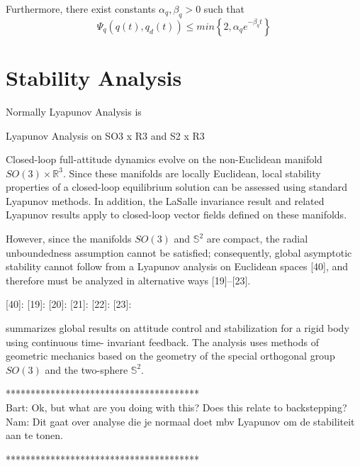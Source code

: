 Furthermore, there exist constants $ \alpha_q,\beta_q>0 $ such that
\begin{equation}\label{key}
\Psi_q(q(t),q_d(t)) \leq min\left\lbrace 2,\alpha_qe^{-\beta_qt}\right\rbrace 
\end{equation}

\section{Stability Analysis}\label{sec:con.sta}

Normally Lyapunov Analysis is 


Lyapunov Analysis on SO3 x R3 and S2 x R3

Closed-loop full-attitude dynamics evolve on the non-Euclidean manifold $ SO(3) \times \mathbb{R}^3 $. 
Since these manifolds are locally Euclidean, local stability properties of a closed-loop equilibrium solution can be assessed using standard Lyapunov methods. In addition, the LaSalle invariance result and related Lyapunov results apply to closed-loop vector fields defined on these manifolds. 

However, since the manifolds $ SO(3) $ and $ \mathbb{S}^2 $ are compact, the radial unboundedness assumption cannot be satisfied; consequently, global asymptotic stability cannot follow from a Lyapunov analysis on Euclidean spaces [40], and therefore must be analyzed in alternative ways [19]–[23].\cite[p.43]{Chaturvedi2011}

[40]:
[19]:
[20]:
[21]:
[22]:
[23]:


\cite{Chaturvedi2011} summarizes global results on attitude control and stabilization for a rigid body using continuous time- invariant feedback. The analysis uses methods of geometric mechanics based on the geometry of the special orthogonal group $ SO(3) $ and the two-sphere $ \mathbb{S}^2 $.


***************************************\\
Bart: Ok, but what are you doing with this? Does this relate to backstepping?\\
Nam: Dit gaat over analyse die je normaal doet mbv Lyapunov om de stabiliteit aan te tonen. 

***************************************\\


